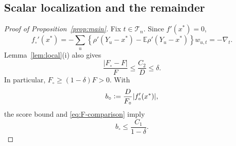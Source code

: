 \documentclass[11pt]{article}
\newcommand{\E}{\mathbb{E}}
\newcommand{\eqdef}{\mathrel{\vcentcolon=}}
\newcommand{\rhohu}{\rho}
\newcommand{\Data}{Y}
\newcommand{\IF}{F}
\newcommand{\IFP}{F_{\circ}}
\newcommand{\DFN}{D}
\newcommand{\fs}{f}
\newcommand{\fp}{f_{\circ}}
\newcommand{\xs}{x^{*}}
\begin{document}
\subsection{Scalar localization and the remainder}\label{sec:scalar-proof}

\begin{proof}[Proof of Proposition~\ref{prop:main}]
Fix \(t\in\mathcal T_n\).  Since \(\fs'(\xs)=0\),
\begin{equation}
  \fp'(\xs)
  =-\sum_u\left\{
      \rhohu'(\Data_u-\xs)-\E\rhohu'(\Data_u-\xs)
    \right\}w_{u,t}
  =-\nabla_t.
  \label{eq:score-sign}
\end{equation}
Lemma~\ref{lem:local}(i) also gives
\begin{equation}
  \frac{|\IFP-\IF|}{\IF}
  \leq\frac{C_2}{\DFN}
  \leq\delta.
  \label{eq:F-comparison}
\end{equation}
In particular, \(\IFP\geq(1-\delta)\IF>0\).  With
\begin{equation}
  b_{\circ}\eqdef
  \frac{\DFN}{\IFP}|\fp'(\xs)|,
  \label{eq:bcirc}
\end{equation}
the score bound and \eqref{eq:F-comparison} imply
\begin{equation}
  b_{\circ}\leq\frac{C_1}{1-\delta}.
  \label{eq:bcirc-bound}
\end{equation}


\end{proof}
\end{document}
